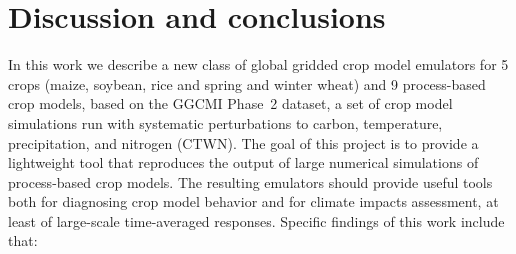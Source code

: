 \documentclass[gmdd]{copernicus} %
\begin{document}
\section{Discussion and conclusions} 
\label{S:6}
In this work we describe a new class of global gridded crop model emulators for 5 crops (maize, soybean, rice and spring and winter wheat) and 9 process-based crop models, based on the GGCMI Phase~2 dataset, a set of crop model simulations run with systematic perturbations to carbon, temperature, precipitation, and nitrogen (CTWN). The goal of this project is to provide a lightweight tool that reproduces the output of large numerical simulations of process-based crop models. The resulting emulators should provide useful tools both for diagnosing crop model behavior and for climate impacts assessment, at least of large-scale time-averaged responses.
Specific findings of this work include that:
\end{document}
